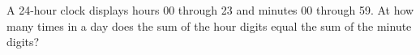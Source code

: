 A 24-hour clock displays hours 00 through 23 and minutes 00 through 59. At how many times in a day does the sum of the hour digits equal the sum of the minute digits?
